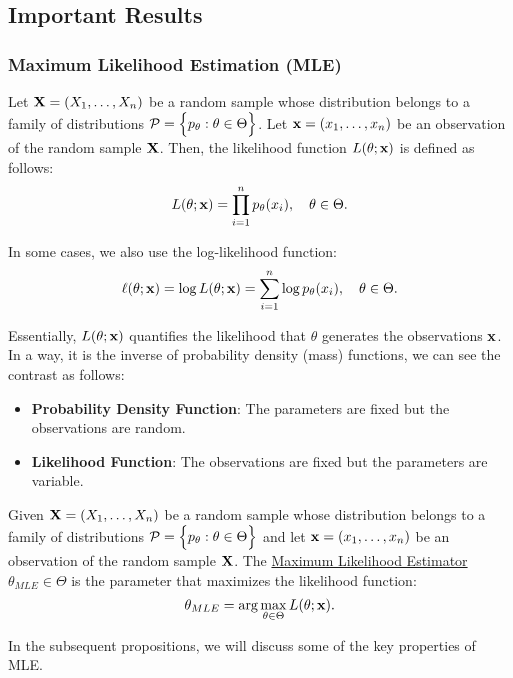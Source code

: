 \subsection{Important Results}
\newcommand{\RB}{\hyperref[thm:rao_blackwell_theorem]{(\mathrm{{\bf RB}})}}
\newcommand{\CRLB}{\hyperref[thm:cramer_rao_lowerbound]{(\mathrm{{\bf CRLB}})}}

\subsubsection{Maximum Likelihood Estimation (MLE)}
\begin{definition}
    Let ${\bf X}=(X_1, \dots, X_n)$ be a random sample whose distribution belongs to a family of distributions $\mathcal{P}=\Big\{ p_\theta:\theta\in\Theta \Big\}$. Let ${\bf x}=(x_1, \dots, x_n)$ be an observation of the random sample ${\bf X}$. Then, the likelihood function $L(\theta;{\bf x})$ is defined as follows:
    \begin{equation}
        L(\theta;{\bf x}) = \prod_{i=1}^n p_\theta(x_i), \quad \theta\in\Theta.
    \end{equation}

    \noindent In some cases, we also use the log-likelihood function:
    \begin{equation}
        \ell(\theta;{\bf x}) = \log L(\theta;{\bf x}) = \sum_{i=1}^n \log p_\theta(x_i), \quad \theta\in\Theta.
    \end{equation}

    \noindent Essentially, $L(\theta;{\bf x})$ quantifies the likelihood that $\theta$ generates the observations ${\bf x}$. In a way, it is the inverse of probability density (mass) functions, we can see the contrast as follows:
    \begin{itemize}
        \item \textbf{Probability Density Function}: The parameters are fixed but the observations are random.
        \item \textbf{Likelihood Function}: The observations are fixed but the parameters are variable.
    \end{itemize} 
\end{definition}

\begin{definition}
    Given ${\bf X}=(X_1, \dots, X_n)$ be a random sample whose distribution belongs to a family of distributions $\mathcal{P}=\Big\{ p_\theta:\theta\in\Theta \Big\}$ and let ${\bf x}=(x_1, \dots, x_n)$ be an observation of the random sample ${\bf X}$. The \underline{Maximum Likelihood Estimator} $\theta_{MLE}\in\Theta$ is the parameter that maximizes the likelihood function:
    \begin{equation}
        \theta_{MLE} = \arg\max_{\theta\in\Theta} L(\theta;{\bf x}).
    \end{equation}

    \noindent In the subsequent propositions, we will discuss some of the key properties of MLE.
\end{definition} 


